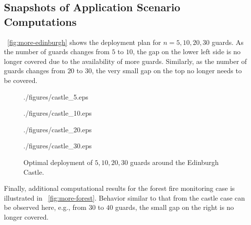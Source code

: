 \subsection{Snapshots of Application Scenario Computations}
~\ref{fig:more-edinburgh} shows the deployment plan for $n = 5, 10, 20, 
30$ guards. As the number of guards changes from $5$ to $10$, the gap on the
lower left side is no longer covered due to the availability of more guards.
Similarly, as the number of guards changes from $20$ to $30$, the very small 
gap on the top no longer needs to be covered.  

\begin{figure}[ht!]
	\begin{center}
		\begin{overpic}[width={\ifoc 4in \else 2.05in \fi},tics=5]{./figures/castle_5.eps}
		\end{overpic}
    \end{center}
	\begin{center}
		\begin{overpic}[width={\ifoc 4in \else 2.05in \fi},tics=5]{./figures/castle_10.eps}
		\end{overpic}
    \end{center}
	\begin{center}
		\begin{overpic}[width={\ifoc 4in \else 2.05in \fi},tics=5]{./figures/castle_20.eps}
		\end{overpic}
    \end{center}
	\begin{center}
		\begin{overpic}[width={\ifoc 4in \else 2.05in \fi},tics=5]{./figures/castle_30.eps}
		\end{overpic}
	\end{center}
	\vspace*{-2mm}
	\caption{\label{fig:opg-more-edinburgh} Optimal deployment of $5, 10, 20, 30$ 
	guards around the Edinburgh Castle.}
\end{figure}

Finally, additional computational results for the forest fire monitoring
case is illustrated in ~\ref{fig:more-forest}. Behavior similar to that 
from the castle case can be observed here, e.g., from $30$ to $40$ 
guards, the small gap on the right is no longer covered. 

